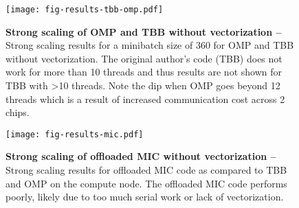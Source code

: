 
\begin{figure}[!hbt]

  \centering
  \texttt{[image: fig-results-tbb-omp.pdf]}

  \caption{\textbf{Strong scaling of OMP and TBB without vectorization --} Strong scaling results for a minibatch size of 360 for OMP and TBB without vectorization. The original author's code (TBB) does not work for more than 10 threads and thus results are not shown for TBB with >10 threads. Note the dip when OMP goes beyond 12 threads which is a result of increased communication cost across 2 chips.}

  \label{fig-results-tbb-omp}

  \centering
  \texttt{[image: fig-results-mic.pdf]}

  \caption{\textbf{Strong scaling of offloaded MIC without vectorization --} Strong scaling results for offloaded MIC code as compared to TBB and OMP on the compute node. The offloaded MIC code performs poorly, likely due to too much serial work or lack of vectorization.}

  \label{fig-results-mic}

\end{figure}
